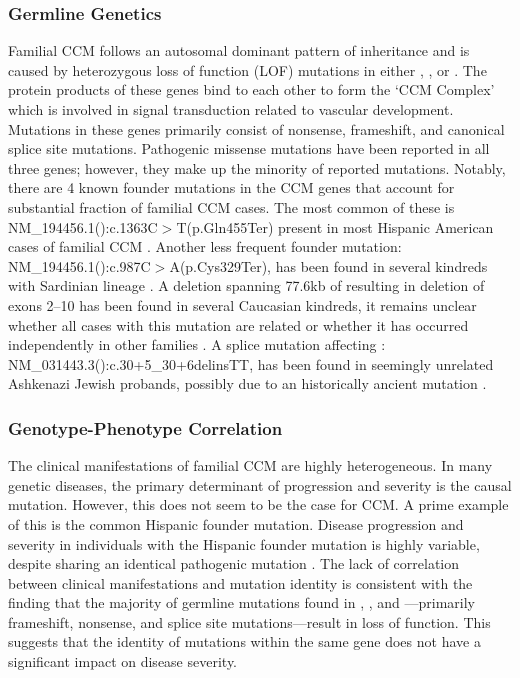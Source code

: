 \subsubsection{Germline Genetics}
Familial CCM follows an autosomal dominant pattern of inheritance \citep{bicknell1978, clark1970, kidd1947} and is caused by heterozygous loss of function (LOF) mutations in either  \citep{labergelecouteulx1999, sahoo1999},  \citep{liquori2003, denier2004}, or  \citep{bergametti2005}. The protein products of these genes bind to each other to form the `CCM Complex' which is involved in signal transduction related to vascular development. Mutations in these genes primarily consist of nonsense, frameshift, and canonical splice site mutations. Pathogenic missense mutations have been reported in all three genes; however, they make up the minority of reported mutations. Notably, there are 4 known founder mutations in the CCM genes that account for substantial fraction of familial CCM cases. The most common of these is NM\_194456.1():c.1363C$>$T(p.Gln455Ter) present in most Hispanic American cases of familial CCM \citep{gunel1996, sahoo1999}. Another less frequent  founder mutation: NM\_194456.1():c.987C$>$A(p.Cys329Ter), has been found in several kindreds with Sardinian lineage \citep{cau2009}. A deletion spanning 77.6kb of  resulting in deletion of exons 2--10 has been found in several Caucasian kindreds, it remains unclear whether all cases with this mutation are related or whether it has occurred independently in other families \citep{liquori2007}. A splice mutation affecting : NM\_031443.3():c.30+5\_30+6delinsTT, has been found in seemingly unrelated Ashkenazi Jewish probands, possibly due to an historically ancient mutation \citep{gallione2011}.

\subsubsection{Genotype-Phenotype Correlation}
The clinical manifestations of familial CCM are highly heterogeneous. In many genetic diseases, the primary determinant of progression and severity is the causal mutation. However, this does not seem to be the case for CCM. A prime example of this is the common Hispanic founder mutation. Disease progression and severity in individuals with the Hispanic founder mutation is highly variable, despite sharing an identical pathogenic mutation \citep{gault2006, laurans2003, denier2004, gianfrancesco2007}. The lack of correlation between clinical manifestations and mutation identity is consistent with the finding that the majority of germline mutations found in , , and ---primarily frameshift, nonsense, and splice site mutations---result in loss of function. This suggests that the identity of mutations within the same gene does not have a significant impact on disease severity.

